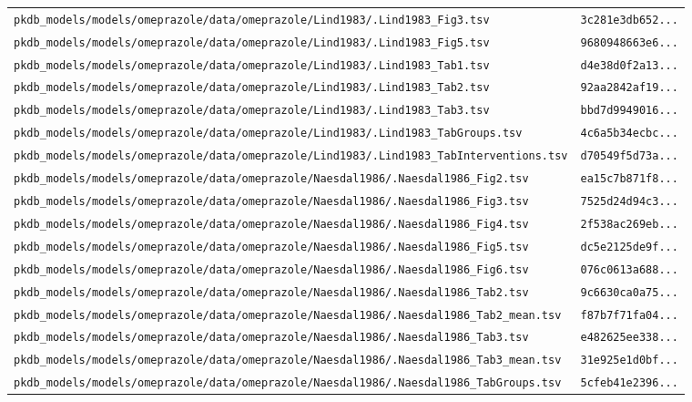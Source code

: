 \documentclass{article}
\begin{document}
\begin{longtable}{ll}
\texttt{pkdb\_models/models/omeprazole/data/omeprazole/Lind1983/.Lind1983\_Fig3.tsv} & \texttt{3c281e3db652...} \\
\texttt{pkdb\_models/models/omeprazole/data/omeprazole/Lind1983/.Lind1983\_Fig5.tsv} & \texttt{9680948663e6...} \\
\texttt{pkdb\_models/models/omeprazole/data/omeprazole/Lind1983/.Lind1983\_Tab1.tsv} & \texttt{d4e38d0f2a13...} \\
\texttt{pkdb\_models/models/omeprazole/data/omeprazole/Lind1983/.Lind1983\_Tab2.tsv} & \texttt{92aa2842af19...} \\
\texttt{pkdb\_models/models/omeprazole/data/omeprazole/Lind1983/.Lind1983\_Tab3.tsv} & \texttt{bbd7d9949016...} \\
\texttt{pkdb\_models/models/omeprazole/data/omeprazole/Lind1983/.Lind1983\_TabGroups.tsv} & \texttt{4c6a5b34ecbc...} \\
\texttt{pkdb\_models/models/omeprazole/data/omeprazole/Lind1983/.Lind1983\_TabInterventions.tsv} & \texttt{d70549f5d73a...} \\
\texttt{pkdb\_models/models/omeprazole/data/omeprazole/Naesdal1986/.Naesdal1986\_Fig2.tsv} & \texttt{ea15c7b871f8...} \\
\texttt{pkdb\_models/models/omeprazole/data/omeprazole/Naesdal1986/.Naesdal1986\_Fig3.tsv} & \texttt{7525d24d94c3...} \\
\texttt{pkdb\_models/models/omeprazole/data/omeprazole/Naesdal1986/.Naesdal1986\_Fig4.tsv} & \texttt{2f538ac269eb...} \\
\texttt{pkdb\_models/models/omeprazole/data/omeprazole/Naesdal1986/.Naesdal1986\_Fig5.tsv} & \texttt{dc5e2125de9f...} \\
\texttt{pkdb\_models/models/omeprazole/data/omeprazole/Naesdal1986/.Naesdal1986\_Fig6.tsv} & \texttt{076c0613a688...} \\
\texttt{pkdb\_models/models/omeprazole/data/omeprazole/Naesdal1986/.Naesdal1986\_Tab2.tsv} & \texttt{9c6630ca0a75...} \\
\texttt{pkdb\_models/models/omeprazole/data/omeprazole/Naesdal1986/.Naesdal1986\_Tab2\_mean.tsv} & \texttt{f87b7f71fa04...} \\
\texttt{pkdb\_models/models/omeprazole/data/omeprazole/Naesdal1986/.Naesdal1986\_Tab3.tsv} & \texttt{e482625ee338...} \\
\texttt{pkdb\_models/models/omeprazole/data/omeprazole/Naesdal1986/.Naesdal1986\_Tab3\_mean.tsv} & \texttt{31e925e1d0bf...} \\
\texttt{pkdb\_models/models/omeprazole/data/omeprazole/Naesdal1986/.Naesdal1986\_TabGroups.tsv} & \texttt{5cfeb41e2396...} \\

\end{longtable}
\end{document}

